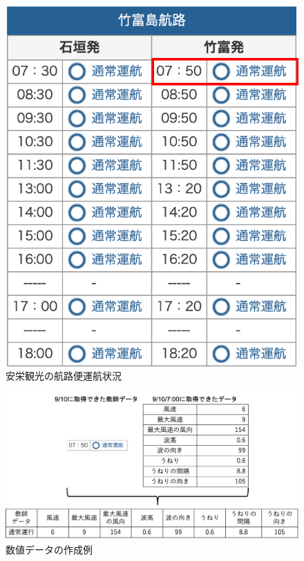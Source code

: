 \documentclass[twocolumn,twoside,9.5pt]{jsarticle}
\begin{document}
 \begin{figure}[H]
 \centering
 \includegraphics[keepaspectratio, scale=0.5]{pic/anei_sample_data.png}
 \caption{安栄観光\cite{anei}の航路便運航状況}
 \label{anei_label}
\end{figure}

\begin{figure}[H]
 \centering
 \includegraphics[keepaspectratio, scale=0.3]{pic/value_dataset.png}
 \caption{数値データの作成例}
 \label{value_data}
\end{figure}
\end{document}
